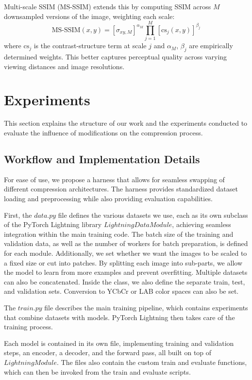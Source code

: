 \documentclass[conference]{IEEEtran}
\begin{document}
Multi-scale SSIM (MS-SSIM) extends this by computing SSIM across $M$ downsampled 
versions of the image, weighting each scale:
\begin{equation}
\mathrm{MS\text{-}SSIM}(x,y) = \left[\sigma_{xy,M}\right]^{\alpha_M}
\prod_{j=1}^{M} \left[\mathrm{cs}_j(x,y)\right]^{\beta_j}
\end{equation}
where $\mathrm{cs}_j$ is the contrast-structure term at scale $j$ and 
$\alpha_M$, $\beta_j$ are empirically determined weights. This better captures perceptual quality across varying viewing distances and 
image resolutions.

\section{Experiments}
This section explains the structure of our work and the experiments conducted to evaluate the influence of modifications on the compression process.

\subsection{Workflow and Implementation Details}
For ease of use, we propose a harness that allows for seamless swapping of different compression architectures. The harness provides standardized dataset loading and preprocessing while also providing evaluation capabilities.

First, the $data.py$ file defines the various datasets we use, each as its own subclass of the PyTorch Lightning \cite{noauthor_pytorch_nodate} library $LightningDataModule$, achieving seamless integration within the main training code. The batch size of the training and validation data, as well as the number of workers for batch preparation, is defined for each module. Additionally, we set whether we want the images to be scaled to a fixed size or cut into patches. By splitting each image into sub-parts, we allow the model to learn from more examples and prevent overfitting. Multiple datasets can also be concatenated. Inside the class, we also define the separate train, test, and validation sets. Conversion to YCbCr or LAB color spaces can also be set.

The $train.py$ file describes the main training pipeline, which contains experiments that combine datasets with models. PyTorch Lightning then takes care of the training process.

Each model is contained in its own file, implementing training and validation steps, an encoder, a decoder, and the forward pass, all built on top of $LightningModule$. The files also contain the custom train and evaluate functions, which can then be invoked from the train and evaluate scripts.
\end{document}
